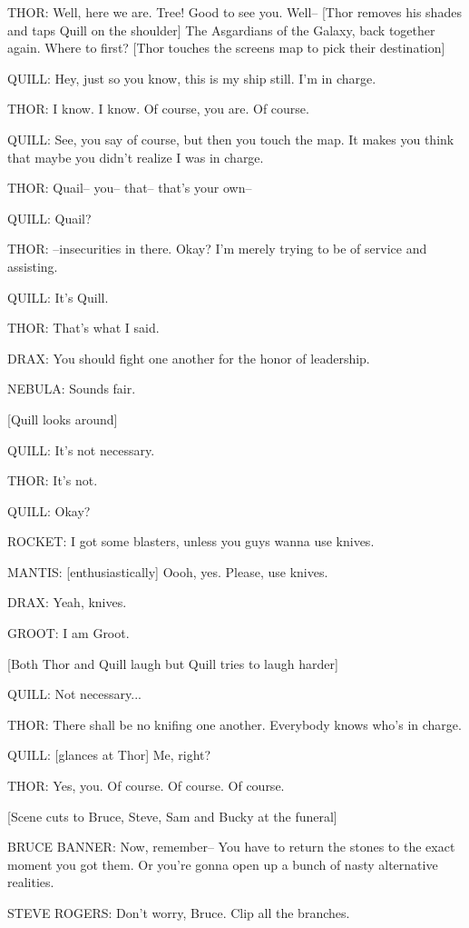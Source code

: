 THOR: Well, here we are. Tree! Good to see you. Well– [Thor removes his shades and taps Quill on the shoulder] The Asgardians of the Galaxy, back together again. Where to first? [Thor touches the screens map to pick their destination]

QUILL: Hey, just so you know, this is my ship still. I'm in charge.

THOR: I know. I know. Of course, you are. Of course.

QUILL: See, you say of course, but then you touch the map. It makes you think that maybe you didn't realize I was in charge.

THOR: Quail– you– that– that's your own–

QUILL: Quail?

THOR: –insecurities in there. Okay? I'm merely trying to be of service and assisting.

QUILL: It's Quill.

THOR: That's what I said.

DRAX: You should fight one another for the honor of leadership.

NEBULA: Sounds fair.

[Quill looks around]

QUILL: It's not necessary.

THOR: It's not.

QUILL: Okay?

ROCKET: I got some blasters, unless you guys wanna use knives.

MANTIS: [enthusiastically] Oooh, yes. Please, use knives.

DRAX: Yeah, knives.

GROOT: I am Groot.

[Both Thor and Quill laugh but Quill tries to laugh harder]

QUILL: Not necessary...

THOR: There shall be no knifing one another. Everybody knows who's in charge.

QUILL: [glances at Thor] Me, right?

THOR: Yes, you. Of course. Of course. Of course.

[Scene cuts to Bruce, Steve, Sam and Bucky at the funeral]

BRUCE BANNER: Now, remember– You have to return the stones to the exact moment you got them. Or you're gonna open up a bunch of nasty alternative realities.

STEVE ROGERS: Don't worry, Bruce. Clip all the branches.

